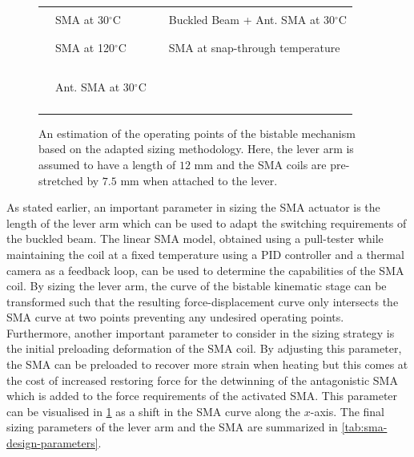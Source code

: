 \begin{figure}[hbt!] %
  \centering
  \resizebox{0.75\textwidth}{!}{}
  \begin{tabular}{l@{ }l l@{ }l}
    {\color{myblue} \rule[2pt]{10pt}{0.5mm} } & {\footnotesize SMA at 30$^{\circ}$C} & {\color{mygreen} \rule[2pt]{10pt}{0.5mm}} & {\footnotesize Buckled Beam + Ant. SMA at 30$^{\circ}$C}\\
    {\color{myred} \rule[2pt]{10pt}{0.5mm} } & {\footnotesize SMA at 120$^{\circ}$C} & {\color{myblack} \dottedrule} & {\footnotesize SMA at snap-through temperature}\\
    {\color{myblue} \rule[2pt]{1pt}{0.5mm} \rule[2pt]{1pt}{0.5mm} \rule[2pt]{1pt}{0.5mm}} & {\footnotesize Ant. SMA at 30$^{\circ}$C} & \\
  \end{tabular}
  \caption[An estimation of the operating points of the bistable mechanism based on the adapted sizing methodology]{An estimation of the operating points of the bistable mechanism based on the adapted sizing methodology. Here, the lever arm is assumed to have a length of $12$ mm and the SMA coils are pre-stretched by $7.5$ mm when attached to the lever.}
  \label{fig:smabb-sizing}
\end{figure}

As stated earlier, an important parameter in sizing the SMA actuator is the length of the lever arm which can be used to adapt the switching requirements of the buckled beam. The linear SMA model, obtained using a pull-tester while maintaining the coil at a fixed temperature using a PID controller and a thermal camera as a feedback loop, can be used to determine the capabilities of the SMA coil. By sizing the lever arm, the curve of the bistable kinematic stage can be transformed such that the resulting force-displacement curve only intersects the SMA curve at two points preventing any undesired operating points. Furthermore, another important parameter to consider in the sizing strategy is the initial preloading deformation of the SMA coil. By adjusting this parameter, the SMA can be preloaded to recover more strain when heating but this comes at the cost of increased restoring force for the detwinning of the antagonistic SMA which is added to the force requirements of the activated SMA. This parameter can be visualised in \cref{fig:smabb-sizing} as a shift in the SMA curve along the $x$-axis. The final sizing parameters of the lever arm and the SMA are summarized in \cref{tab:sma-design-parameters}.

